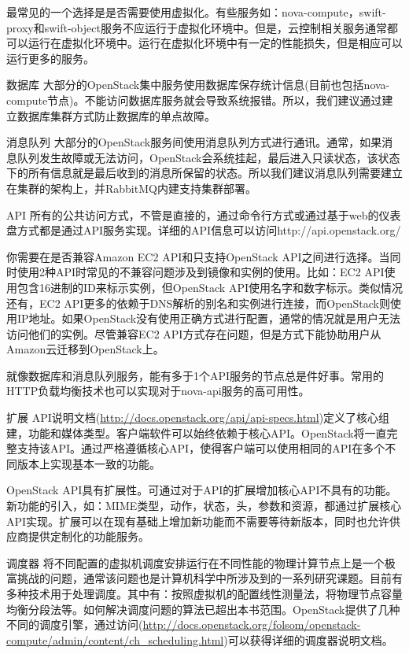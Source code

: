\documentclass[letterpaper,10pt,english]{sphinxmanual}
\begin{document}
最常见的一个选择是是否需要使用虚拟化。有些服务如：nova-compute，swift-proxy和swift-object服务不应运行于虚拟化环境中。但是，云控制相关服务通常都可以运行在虚拟化环境中。运行在虚拟化环境中有一定的性能损失，但是相应可以运行更多的服务。

数据库
大部分的OpenStack集中服务使用数据库保存统计信息(目前也包括nova-compute节点)。不能访问数据库服务就会导致系统报错。所以，我们建议通过建立数据库集群方式防止数据库的单点故障。

消息队列
大部分的OpenStack服务间使用消息队列方式进行通讯。通常，如果消息队列发生故障或无法访问，OpenStack会系统挂起，最后进入只读状态，该状态下的所有信息就是最后收到的消息所保留的状态。所以我们建议消息队列需要建立在集群的架构上，并RabbitMQ内建支持集群部署。

API
所有的公共访问方式，不管是直接的，通过命令行方式或通过基于web的仪表盘方式都是通过API服务实现。详细的API信息可以访问http://api.openstack.org/

你需要在是否兼容Amazon EC2 API和只支持OpenStack API之间进行选择。当同时使用2种API时常见的不兼容问题涉及到镜像和实例的使用。比如：EC2 API使用包含16进制的ID来标示实例，但OpenStack API使用名字和数字标示。类似情况还有，EC2 API更多的依赖于DNS解析的别名和实例进行连接，而OpenStack则使用IP地址。如果OpenStack没有使用正确方式进行配置，通常的情况就是用户无法访问他们的实例。尽管兼容EC2 API方式存在问题，但是方式下能协助用户从Amazon云迁移到OpenStack上。

就像数据库和消息队列服务，能有多于1个API服务的节点总是件好事。常用的HTTP负载均衡技术也可以实现对于nova-api服务的高可用性。

扩展
API说明文档(\href{http://docs.openstack.org/api/api-specs.html}{http://docs.openstack.org/api/api-specs.html})定义了核心组建，功能和媒体类型。客户端软件可以始终依赖于核心API。OpenStack将一直完整支持该API。通过严格遵循核心API，使得客户端可以使用相同的API在多个不同版本上实现基本一致的功能。

OpenStack API具有扩展性。可通过对于API的扩展增加核心API不具有的功能。新功能的引入，如：MIME类型，动作，状态，头，参数和资源，都通过扩展核心API实现。扩展可以在现有基础上增加新功能而不需要等待新版本，同时也允许供应商提供定制化的功能服务。

调度器
将不同配置的虚拟机调度安排运行在不同性能的物理计算节点上是一个极富挑战的问题，通常该问题也是计算机科学中所涉及到的一系列研究课题。目前有多种技术用于处理调度。其中有：按照虚拟机的配置线性测量法，将物理节点容量均衡分段法等。如何解决调度问题的算法已超出本书范围。OpenStack提供了几种不同的调度引擎，通过访问(\href{http://docs.openstack.org/folsom/openstack-compute/admin/content/ch\_scheduling.html}{http://docs.openstack.org/folsom/openstack-compute/admin/content/ch\_scheduling.html})可以获得详细的调度器说明文档。
\end{document}
